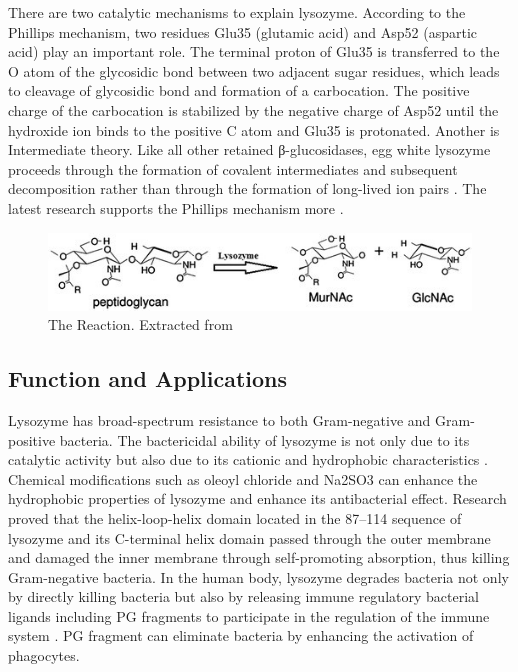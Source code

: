 There are two catalytic mechanisms to explain lysozyme. According to the Phillips mechanism, two residues Glu35 (glutamic acid) and Asp52 (aspartic acid) play an important role. The terminal proton of Glu35 is transferred to the O atom of the glycosidic bond between two adjacent sugar residues, which leads to cleavage of glycosidic bond and formation of a carbocation. The positive charge of the carbocation is stabilized by the negative charge of Asp52 until the hydroxide ion binds to the positive C atom and Glu35 is protonated. Another is Intermediate theory. Like all other retained β-glucosidases, egg white lysozyme proceeds through the formation of covalent intermediates and subsequent decomposition rather than through the formation of long-lived ion pairs \citep{Vocadlo2001}. The latest research supports the Phillips mechanism more \citep{Held2014}.

\begin{figure}[!h]
	\centering
	\includegraphics[width=0.9\linewidth]{figures/chp1_lysozyme_mechanism}
	\caption{The Reaction. Extracted from \cite{Ercan2016}}
	\label{fig:chp1lysozymemechanism}
\end{figure}

\subsection{Function and Applications}
Lysozyme has broad-spectrum resistance to both Gram-negative and Gram-positive bacteria. The bactericidal ability of lysozyme is not only due to its catalytic activity but also due to its cationic and hydrophobic characteristics \citep{Pellegrini1992}. Chemical modifications such as oleoyl chloride \citep{Evran2010} and Na2SO3 \citep{Liu2018} can enhance the hydrophobic properties of lysozyme and enhance its antibacterial effect. Research \citep{Ibrahim2001} proved that the helix-loop-helix domain located in the 87–114 sequence of lysozyme and its C-terminal helix domain passed through the outer membrane and damaged the inner membrane through self-promoting absorption, thus killing Gram-negative bacteria. In the human body, lysozyme degrades bacteria not only by directly killing bacteria but also by releasing immune regulatory bacterial ligands including PG fragments to participate in the regulation of the immune system \citep{ragland2017bacterial}. PG fragment can eliminate bacteria by enhancing the activation of phagocytes.

